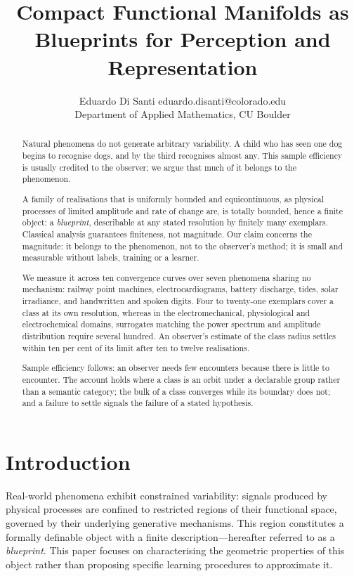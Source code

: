 \documentclass[10pt]{article}
\title{Compact Functional Manifolds as Blueprints for Perception and Representation}
\author{\name Eduardo Di Santi \email eduardo.disanti@colorado.edu \\
      \addr Department of Applied Mathematics, CU Boulder
}
\date{}
\theoremstyle{plain}
\theoremstyle{definition}
\theoremstyle{remark}
\begin{document}
\maketitle

\begin{abstract}
Natural phenomena do not generate arbitrary variability. A child who has seen
one dog begins to recognise dogs, and by the third recognises almost any. This
sample efficiency is usually credited to the observer; we argue that much of it
belongs to the phenomenon.

A family of realisations that is uniformly bounded and equicontinuous, as
physical processes of limited amplitude and rate of change are, is totally
bounded, hence a finite object: a \emph{blueprint}, describable at any stated
resolution by finitely many exemplars. Classical analysis guarantees
finiteness, not magnitude. Our claim concerns the magnitude: it belongs to the
phenomenon, not to the observer's method; it is small and measurable without
labels, training or a learner.

We measure it across ten convergence curves over seven phenomena sharing no
mechanism: railway point machines, electrocardiograms, battery discharge,
tides, solar irradiance, and handwritten and spoken digits. Four to twenty-one
exemplars cover a class at its own resolution, whereas in the
electromechanical, physiological and electrochemical domains, surrogates
matching the power spectrum and amplitude distribution require several
hundred. An observer's estimate of the class radius settles within ten per
cent of its limit after ten to twelve realisations.

Sample efficiency follows: an observer needs few encounters because there is
little to encounter. The account holds where a class is an orbit under a
declarable group rather than a semantic category; the bulk of a class
converges while its boundary does not; and a failure to settle signals the
failure of a stated hypothesis.
\end{abstract}



\section{Introduction}
\label{sec:introduction}

Real-world phenomena exhibit constrained variability: signals produced by physical
processes are confined to restricted regions of their functional space, governed
by their underlying generative mechanisms. This region constitutes a formally
definable object with a finite description---hereafter referred to as a
\emph{blueprint}. This paper focuses on characterising the geometric
properties of this object rather than proposing specific learning procedures to
approximate it.
\end{document}

